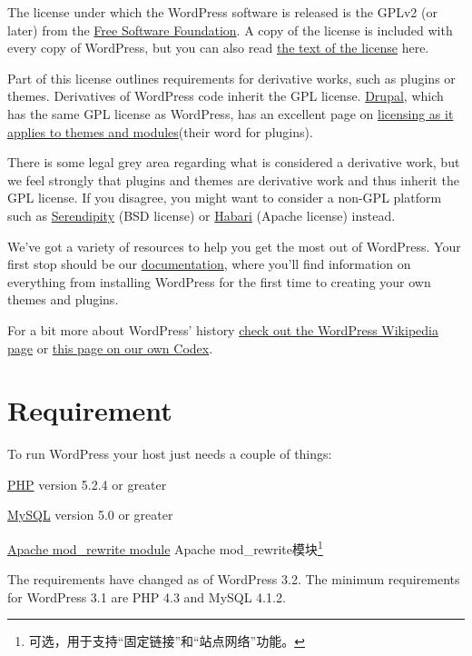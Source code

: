 The license under which the WordPress software is released is the GPLv2 (or later) from the \href{http://www.fsf.org/}{Free Software Foundation}. A copy of the license is included with every copy of WordPress, but you can also read \href{http://wordpress.org/about/gpl/}{the text of the license} here.

Part of this license outlines requirements for derivative works, such as plugins or themes. Derivatives of WordPress code inherit the GPL license. \href{http://drupal.org/}{Drupal}, which has the same GPL license as WordPress, has an excellent page on \href{http://drupal.org/licensing/faq/}{licensing as it applies to themes and modules}(their word for plugins).

There is some legal grey area regarding what is considered a derivative work, but we feel strongly that plugins and themes are derivative work and thus inherit the GPL license. If you disagree, you might want to consider a non-GPL platform such as \href{http://www.s9y.org/}{Serendipity} (BSD license) or \href{http://habariproject.org/en/}{Habari} (Apache license) instead.

We've got a variety of resources to help you get the most out of WordPress. Your first stop should be our \href{http://codex.wordpress.org/}{documentation}, where you'll find information on everything from installing WordPress for the first time to creating your own themes and plugins.

For a bit more about WordPress' history \href{http://en.wikipedia.org/wiki/WordPress}{check out the WordPress Wikipedia page} or \href{http://codex.wordpress.org/History}{this page on our own Codex}.

\chapter{Requirement}

To run WordPress your host just needs a couple of things:
\begin{compactitem}
\item \href{http://www.php.net/}{PHP} version 5.2.4 or greater
\item \href{http://www.mysql.com/}{MySQL} version 5.0 or greater
\item \href{http://httpd.apache.org/docs/current/mod/mod_rewrite.html}{Apache mod\_rewrite module} Apache mod\_rewrite模块\footnote{可选，用于支持“固定链接”和“站点网络”功能。}
\end{compactitem}

The requirements have changed as of WordPress 3.2. The minimum requirements for WordPress 3.1 are PHP 4.3 and MySQL 4.1.2.

